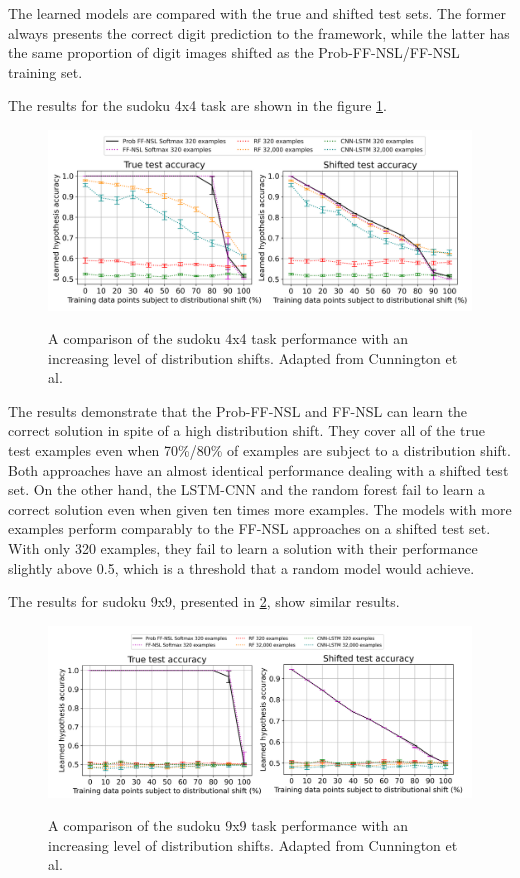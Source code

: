 The learned models are compared with the true and shifted test sets.
The former always presents the correct digit prediction to the framework, while the latter has the same proportion of digit images shifted as the Prob-FF-NSL/FF-NSL training set.

The results for the sudoku 4x4 task are shown in the figure \ref{sudoku4x4-results}.

\begin{figure}[h]
\caption{A comparison of the sudoku 4x4 task performance with an increasing level of distribution shifts. Adapted from Cunnington et al. \cite{RefWorks:RefID:71-cunnington2021ff-nsl:}}
\centering
\includegraphics[width=\textwidth]{logic-based-classification/sudoku4x4.png}
\label{sudoku4x4-results}
\end{figure}

The results demonstrate that the Prob-FF-NSL and FF-NSL can learn the correct solution in spite of a high distribution shift.
They cover all of the true test examples even when 70\%/80\% of examples are subject to a distribution shift.
Both approaches have an almost identical performance dealing with a shifted test set.
On the other hand, the LSTM-CNN and the random forest fail to learn a correct solution even when given ten times more examples.
The models with more examples perform comparably to the FF-NSL approaches on a shifted test set.
With only 320 examples, they fail to learn a solution with their performance slightly above 0.5, which is a threshold that a random model would achieve.

The results for sudoku 9x9, presented in \ref{sudoku9x9-results}, show similar results.
\begin{figure}[h]
\caption{A comparison of the sudoku 9x9 task performance with an increasing level of distribution shifts. Adapted from Cunnington et al. \cite{RefWorks:RefID:71-cunnington2021ff-nsl:}}
\centering
\includegraphics[width=\textwidth]{logic-based-classification/sudoku9x9.png}
\label{sudoku9x9-results}
\end{figure}

